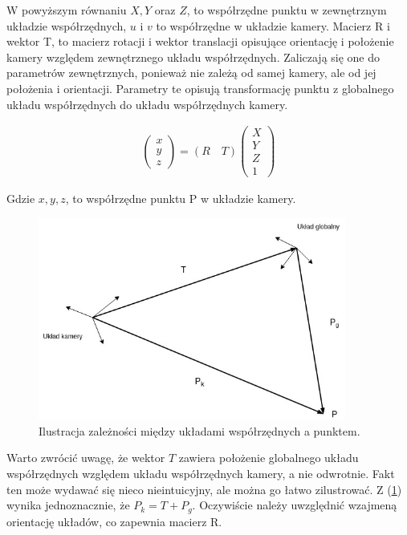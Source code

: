 \documentclass[oneside, eng]{mgr}
\begin{document}
W powyższym równaniu $X, Y$ oraz $Z$, to współrzędne punktu w zewnętrznym układzie współrzędnych,
$u$ i $v$ to współrzędne w układzie kamery.
Macierz R i wektor T, to macierz rotacji i wektor translacji opisujące orientację i położenie kamery względem zewnętrznego układu współrzędnych. Zaliczają się one do parametrów zewnętrznych, ponieważ nie zależą od samej kamery, ale od jej położenia i orientacji. Parametry te opisują transformację punktu z globalnego układu współrzędnych do układu współrzędnych kamery. 

\begin{align*}
	\left( \begin{array}{l} x \\ y \\ z \end{array} \right) =
	(R \quad T)
	\left( \begin{array}{l}
		X \\	Y \\	Z \\	1
	\end{array} \right) 
\end{align*}

Gdzie $x, y, z$, to współrzędne punktu P w układzie kamery.


\begin{figure}
\centering
	\includegraphics[width=0.90\textwidth]{pinhole.jpg}\par\vspace{1cm}
\caption{Ilustracja zależności między układami współrzędnych a punktem.}
	\label{fig:camera_coordinate_systems}
\end{figure}

Warto zwrócić uwagę, że wektor $T$ zawiera położenie globalnego układu współrzędnych względem układu współrzędnych kamery, a nie odwrotnie. Fakt ten może wydawać się nieco nieintuicyjny, ale można go łatwo zilustrować. Z (\ref{fig:camera_coordinate_systems}) wynika jednoznacznie, że $P_k = T + P_g$. Oczywiście należy uwzględnić wzajmeną orientację układów, co zapewnia macierz R.
\end{document}
